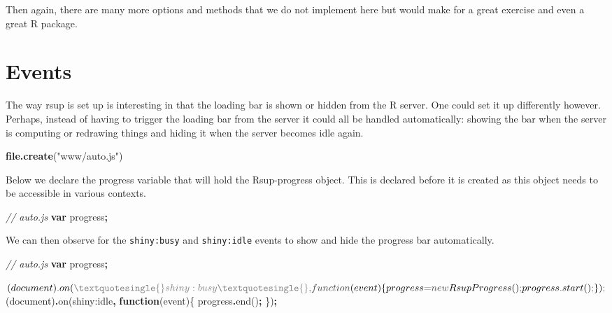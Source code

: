 \documentclass[
]{krantz}
\makeatletter
\newenvironment{Shaded}{\begin{snugshade}}{\end{snugshade}}
\newcommand{\BuiltInTok}[1]{#1}
\newcommand{\CommentTok}[1]{\textcolor[rgb]{0.37,0.37,0.37}{\textit{#1}}}
\newcommand{\FunctionTok}[1]{\textcolor[rgb]{0,0,0}{#1}}
\newcommand{\KeywordTok}[1]{\textcolor[rgb]{0.27,0.27,0.27}{\textbf{#1}}}
\newcommand{\NormalTok}[1]{#1}
\newcommand{\OperatorTok}[1]{\textcolor[rgb]{0.43,0.43,0.43}{\textbf{#1}}}
\newcommand{\StringTok}[1]{\textcolor[rgb]{0.5,0.5,0.5}{#1}}
\newenvironment{kframe}{%
\medskip{}
\setlength{\fboxsep}{.8em}
 \def\at@end@of@kframe{}%
 \ifinner\ifhmode%
  \def\at@end@of@kframe{\end{minipage}}%
  \begin{minipage}{\columnwidth}%
 \fi\fi%
 \def\FrameCommand##1{\hskip\@totalleftmargin \hskip-\fboxsep
 \colorbox{shadecolor}{##1}\hskip-\fboxsep
     \hskip-\linewidth \hskip-\@totalleftmargin \hskip\columnwidth}%
 \MakeFramed {\advance\hsize-\width
   \@totalleftmargin\z@ \linewidth\hsize
   \@setminipage}}%
 {\par\unskip\endMakeFramed%
 \at@end@of@kframe}
\renewenvironment{Shaded}{\begin{kframe}}{\end{kframe}}
\makeatother
\begin{document}
Then again, there are many more options and methods that we do not implement here but would make for a great exercise and even a great R package.

\hypertarget{events}{%
\section*{Events}\label{events}}


The way rsup is set up is interesting in that the loading bar is shown or hidden from the R server. One could set it up differently however. Perhaps, instead of having to trigger the loading bar from the server it could all be handled automatically: showing the bar when the server is computing or redrawing things and hiding it when the server becomes idle again.

\begin{Shaded}
\begin{Highlighting}[]
\KeywordTok{file.create}\NormalTok{(}\StringTok{"www/auto.js"}\NormalTok{)}
\end{Highlighting}
\end{Shaded}

Below we declare the progress variable that will hold the Rsup-progress object. This is declared before it is created as this object needs to be accessible in various contexts.

\begin{Shaded}
\begin{Highlighting}[]
\CommentTok{// auto.js}
\KeywordTok{var}\NormalTok{ progress}\OperatorTok{;}
\end{Highlighting}
\end{Shaded}

We can then observe for the \texttt{shiny:busy} and \texttt{shiny:idle} events to show and hide the progress bar automatically.

\begin{Shaded}
\begin{Highlighting}[]
\CommentTok{// auto.js}
\KeywordTok{var}\NormalTok{ progress}\OperatorTok{;}

\NormalTok{$(}\BuiltInTok{document}\NormalTok{)}\OperatorTok{.}\FunctionTok{on}\NormalTok{(}\StringTok{\textquotesingle{}shiny:busy\textquotesingle{}}\OperatorTok{,} \KeywordTok{function}\NormalTok{(}\BuiltInTok{event}\NormalTok{)\{}
\NormalTok{  progress }\OperatorTok{=} \KeywordTok{new}\NormalTok{ RsupProgress()}\OperatorTok{;}
\NormalTok{  progress}\OperatorTok{.}\FunctionTok{start}\NormalTok{()}\OperatorTok{;}
\NormalTok{\})}\OperatorTok{;}

\NormalTok{$(}\BuiltInTok{document}\NormalTok{)}\OperatorTok{.}\FunctionTok{on}\NormalTok{(}\StringTok{\textquotesingle{}shiny:idle\textquotesingle{}}\OperatorTok{,} \KeywordTok{function}\NormalTok{(}\BuiltInTok{event}\NormalTok{)\{}
\NormalTok{  progress}\OperatorTok{.}\FunctionTok{end}\NormalTok{()}\OperatorTok{;}
\NormalTok{\})}\OperatorTok{;}
\end{Highlighting}
\end{Shaded}
\end{document}
